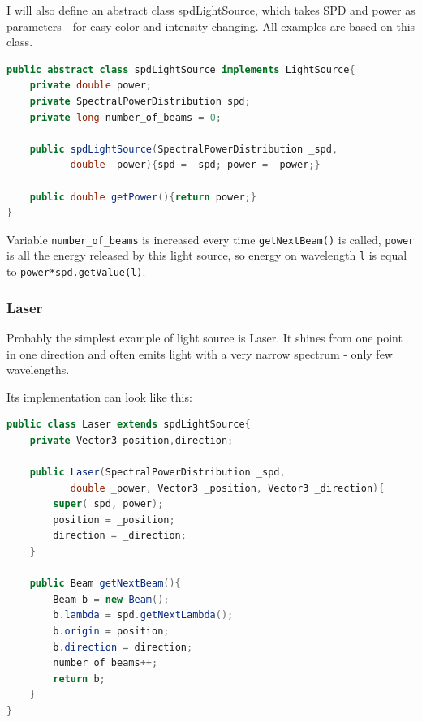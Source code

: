 \documentclass[12pt, letterpaper]{article}
\begin{document}
I will also define an abstract class spdLightSource, which takes SPD and power as parameters - for easy color and intensity changing. All examples are based on this class. 
\begin{lstlisting}[language=Java]
public abstract class spdLightSource implements LightSource{
	private double power;
	private SpectralPowerDistribution spd;
	private long number_of_beams = 0;
	
	public spdLightSource(SpectralPowerDistribution _spd,
	       double _power){spd = _spd; power = _power;}
	
	public double getPower(){return power;}
}
\end{lstlisting}
Variable \verb|number_of_beams| is increased every time \verb|getNextBeam()| is called, \verb|power| is all the energy released by this light source, so energy on wavelength \verb|l| is equal to \verb|power*spd.getValue(l)|.

\subsubsection{Laser}
Probably the simplest example of light source is Laser. It shines from one point in one direction and often emits light with a very narrow spectrum - only few wavelengths.

Its implementation can look like this:
\begin{lstlisting}[language=Java]
public class Laser extends spdLightSource{
	private Vector3 position,direction;	
		
	public Laser(SpectralPowerDistribution _spd, 
	       double _power, Vector3 _position, Vector3 _direction){
		super(_spd,_power);
		position = _position;
		direction = _direction;		
	}

	public Beam getNextBeam(){
		Beam b = new Beam();	
		b.lambda = spd.getNextLambda();
		b.origin = position;
		b.direction = direction;
		number_of_beams++;
		return b;
	}
}
\end{lstlisting}
\end{document}
